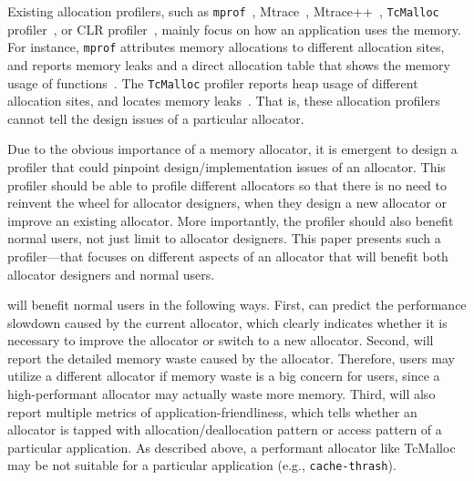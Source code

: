Existing allocation profilers, such as \texttt{mprof}~\cite{Zorn:1988:MAP:894814}, Mtrace~\cite{mtrace}, Mtrace++~\cite{Lee:2000:DMM:786772.787150}, \texttt{TcMalloc} profiler~\cite{tcmalloc-profiler}, or CLR profiler~\cite{lupasc2014dynamic}, mainly focus on how an application uses the memory. For instance, \texttt{mprof} attributes memory allocations to different allocation sites, and reports memory leaks and a direct allocation table that shows the memory usage of functions~\cite{Zorn:1988:MAP:894814}. The \texttt{TcMalloc} profiler reports heap usage of different allocation sites, and locates memory leaks~\cite{tcmalloc-profiler}. That is, these allocation profilers cannot tell the design issues of a particular allocator. 

Due to the obvious importance of a memory allocator, it is emergent to design a profiler that could pinpoint design/implementation issues of an allocator. This profiler should be able to profile different allocators so that there is no need to reinvent the wheel for allocator designers, when they design a new allocator or improve an existing allocator. More importantly, the profiler should also benefit normal users, not just limit to allocator designers. This paper presents such a profiler--\MP{}--that focuses on different aspects of an allocator that will benefit both allocator designers and normal users. 

\MP{} will benefit normal users in the following ways. First, \MP{} can predict the performance slowdown caused by the current allocator, which clearly indicates whether it is necessary to improve the allocator or switch to a new allocator. Second, \MP{} will report the detailed memory waste caused by the allocator. Therefore, users may utilize a different allocator if memory waste is a big concern for users, since a high-performant allocator may actually waste more memory. Third, \MP{} will also report multiple metrics of application-friendliness, which tells whether an allocator is tapped with allocation/deallocation pattern or access pattern of a particular application. As described above, a performant allocator like TcMalloc may be  not suitable for a particular application (e.g., \texttt{cache-thrash}). 
 
